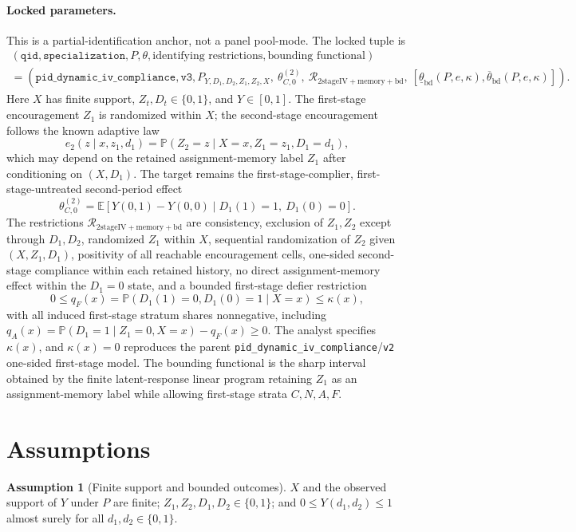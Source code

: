 \documentclass[11pt]{article}
\newcommand{\E}{\mathbb{E}}
\renewcommand{\Pr}{\mathbb{P}}
\theoremstyle{definition}
\newtheorem{assumption}{Assumption}
\theoremstyle{plain}
\theoremstyle{remark}
\begin{document}
\paragraph{Locked parameters.}
This is a partial-identification anchor, not a panel pool-mode.  The locked tuple is
\[
\begin{gathered}
(\texttt{qid},\texttt{specialization},P,\theta,\text{identifying restrictions},
  \text{bounding functional})\\
=
(\texttt{pid\_dynamic\_iv\_compliance},\texttt{v3},
  P_{Y,D_1,D_2,Z_1,Z_2,X},\ \theta_{C,0}^{(2)},\
  \mathcal{R}_{\mathrm{2stageIV+memory+bd}},\
  [\underline\theta_{\mathrm{bd}}(P,e,\kappa),\overline\theta_{\mathrm{bd}}(P,e,\kappa)]) .
\end{gathered}
\]
Here \(X\) has finite support, \(Z_t,D_t\in\{0,1\}\), and \(Y\in[0,1]\).  The first-stage encouragement \(Z_1\) is randomized within \(X\); the second-stage encouragement follows the known adaptive law
\[
e_2(z\mid x,z_1,d_1)=\Pr(Z_2=z\mid X=x,Z_1=z_1,D_1=d_1),
\]
which may depend on the retained assignment-memory label \(Z_1\) after conditioning on \((X,D_1)\).  The target remains the first-stage-complier, first-stage-untreated second-period effect
\[
\theta_{C,0}^{(2)}
=\E\!\left[Y(0,1)-Y(0,0)\mid D_1(1)=1,\ D_1(0)=0\right].
\]
The restrictions \(\mathcal{R}_{\mathrm{2stageIV+memory+bd}}\) are consistency, exclusion of \(Z_1,Z_2\) except through \(D_1,D_2\), randomized \(Z_1\) within \(X\), sequential randomization of \(Z_2\) given \((X,Z_1,D_1)\), positivity of all reachable encouragement cells, one-sided second-stage compliance within each retained history, no direct assignment-memory effect within the \(D_1=0\) state, and a bounded first-stage defier restriction
\[
0\le q_F(x)=\Pr(D_1(1)=0,D_1(0)=1\mid X=x)\le\kappa(x),
\]
with all induced first-stage stratum shares nonnegative, including \(q_A(x)=\Pr(D_1=1\mid Z_1=0,X=x)-q_F(x)\ge0\).  The analyst specifies \(\kappa(x)\), and \(\kappa(x)=0\) reproduces the parent \texttt{pid\_dynamic\_iv\_compliance}/\texttt{v2} one-sided first-stage model.  The bounding functional is the sharp interval obtained by the finite latent-response linear program retaining \(Z_1\) as an assignment-memory label while allowing first-stage strata \(C,N,A,F\).

\section{Assumptions}\label{sec:assumptions}
\begin{assumption}[Finite support and bounded outcomes]\label{ass:finite-bounded}
\(X\) and the observed support of \(Y\) under \(P\) are finite; \(Z_1,Z_2,D_1,D_2\in\{0,1\}\); and \(0\le Y(d_1,d_2)\le1\) almost surely for all \(d_1,d_2\in\{0,1\}\).
\end{assumption}
\end{document}
